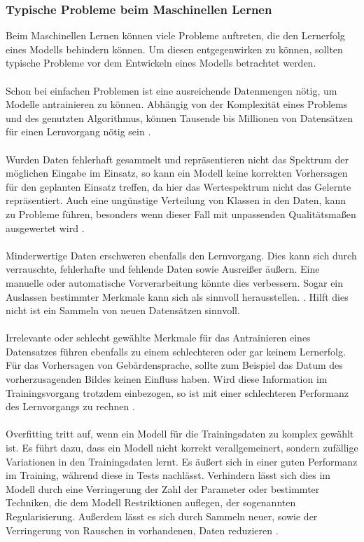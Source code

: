 \documentclass[11pt,bibliography=totocnumbered]{scrartcl}
\begin{document}
\subsubsection{Typische Probleme beim Maschinellen Lernen}
Beim Maschinellen Lernen können viele Probleme auftreten, die den Lernerfolg eines Modells behindern können. Um diesen entgegenwirken zu können, sollten typische Probleme vor dem Entwickeln eines Modells betrachtet werden.
\\\\
Schon bei einfachen Problemen ist eine ausreichende Datenmengen nötig, um Modelle antrainieren zu können. Abhängig von der Komplexität eines Problems und des genutzten Algorithmus, können Tausende bis Millionen von Datensätzen für einen Lernvorgang nötig sein \cite[S.23]{MACHINE_LEARNING}\cite[S.4]{BA}.
\\\\
Wurden Daten fehlerhaft gesammelt und repräsentieren nicht das Spektrum der möglichen Eingabe im Einsatz, so kann ein Modell keine korrekten Vorhersagen für den geplanten Einsatz treffen, da hier das Wertespektrum nicht das Gelernte repräsentiert. Auch eine ungünstige Verteilung von Klassen in den Daten, kann zu Probleme führen, besonders wenn dieser Fall mit unpassenden Qualitätsmaßen ausgewertet wird \cite[S.24-25]{MACHINE_LEARNING}\cite[S.4]{BA}.
\\\\
Minderwertige Daten erschweren ebenfalls den Lernvorgang. Dies kann sich durch verrauschte, fehlerhafte und fehlende Daten sowie Ausreißer äußern. Eine manuelle oder automatische Vorverarbeitung könnte dies verbessern. Sogar ein Auslassen bestimmter Merkmale kann sich als sinnvoll herausstellen. \cite[S.26]{MACHINE_LEARNING}\cite[S.3]{BA}. Hilft dies nicht ist ein Sammeln von neuen Datensätzen sinnvoll.
\\\\
Irrelevante oder schlecht gewählte Merkmale für das Antrainieren eines Datensatzes führen ebenfalls zu einem schlechteren oder gar keinem Lernerfolg. Für das Vorhersagen von Gebärdensprache, sollte zum Beispiel das Datum des vorherzusagenden Bildes keinen Einfluss haben. Wird diese Information im Trainingsvorgang trotzdem einbezogen, so ist mit einer schlechteren Performanz des Lernvorgangs zu rechnen \cite[S.26]{MACHINE_LEARNING}\cite[S.4]{BA}. 
\\\\
Overfitting tritt auf, wenn ein Modell für die Trainingsdaten zu komplex gewählt ist. Es führt dazu, dass ein Modell nicht korrekt verallgemeinert, sondern zufällige Variationen in den Trainingsdaten lernt. Es äußert sich in einer guten Performanz im Training, während diese in Tests nachlässt. Verhindern lässt sich dies im Modell durch eine Verringerung der Zahl der Parameter oder bestimmter Techniken, die dem Modell Restriktionen auflegen, der sogenannten Regularisierung. Außerdem lässt es sich durch Sammeln neuer, sowie der Verringerung von Rauschen in vorhandenen, Daten reduzieren \cite[S.27]{MACHINE_LEARNING}\cite[S.13]{BA}.
\end{document}
